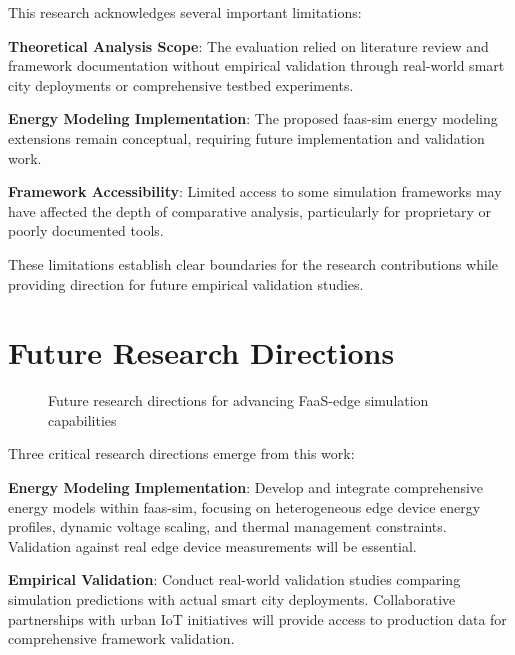 This research acknowledges several important limitations:

\textbf{Theoretical Analysis Scope}: The evaluation relied on literature review and framework documentation without empirical validation through real-world smart city deployments or comprehensive testbed experiments.

\textbf{Energy Modeling Implementation}: The proposed faas-sim energy modeling extensions remain conceptual, requiring future implementation and validation work.

\textbf{Framework Accessibility}: Limited access to some simulation frameworks may have affected the depth of comparative analysis, particularly for proprietary or poorly documented tools.

These limitations establish clear boundaries for the research contributions while providing direction for future empirical validation studies.

\section{Future Research Directions}

\begin{figure}[htbp]
\centering
{}
\caption{Future research directions for advancing FaaS-edge simulation capabilities}
\label{fig:future-research}
\end{figure}

Three critical research directions emerge from this work:

\textbf{Energy Modeling Implementation}: Develop and integrate comprehensive energy models within faas-sim, focusing on heterogeneous edge device energy profiles, dynamic voltage scaling, and thermal management constraints. Validation against real edge device measurements will be essential.

\textbf{Empirical Validation}: Conduct real-world validation studies comparing simulation predictions with actual smart city deployments. Collaborative partnerships with urban IoT initiatives will provide access to production data for comprehensive framework validation.

